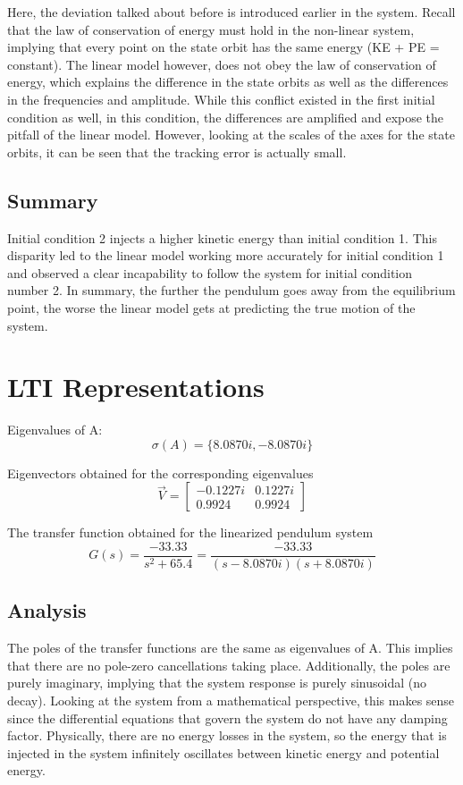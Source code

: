 \documentclass[10pt]{article}
\begin{document}
Here, the deviation talked about before is introduced earlier in the system. Recall that the law of conservation of energy must hold in the non-linear system, implying that every point on the state orbit has the same energy (KE + PE = constant). The linear model however, does not obey the law of conservation of energy, which explains the difference in the state orbits as well as the differences in the frequencies and amplitude. While this conflict existed in the first initial condition as well, in this condition, the differences are amplified and expose the pitfall of the linear model. However, looking at the scales of the axes for the state orbits, it can be seen that the tracking error is actually small. 

\subsection{Summary}
Initial condition 2 injects a higher kinetic energy than initial condition 1. This disparity led to the linear model working more accurately for initial condition 1 and observed a clear incapability to follow the system for initial condition number 2. In summary, the further the pendulum goes away from the equilibrium point, the worse the linear model gets at predicting the true motion of the system.

\section{LTI Representations}
Eigenvalues of A:
\begin{equation*}
    \sigma(A) = \{8.0870i, -8.0870i\}
\end{equation*}

Eigenvectors obtained for the corresponding eigenvalues
\begin{equation*}
    \vec{V} = \begin{bmatrix}
    -0.1227i & 0.1227i\\ 0.9924 & 0.9924 
    \end{bmatrix}
\end{equation*}

The transfer function obtained for the linearized pendulum system
\begin{equation*}
G(s) = \frac{-33.33}{s^2+65.4} = \frac{-33.33}{(s-8.0870i)(s+8.0870i)} 
\end{equation*}

\subsection{Analysis}
The poles of the transfer functions are the same as eigenvalues of A. This implies that there are no pole-zero cancellations taking place. Additionally, the poles are purely imaginary, implying that the system response is purely sinusoidal (no decay). Looking at the system from a mathematical perspective, this makes sense since the differential equations that govern the system do not have any damping factor. Physically, there are no energy losses in the system, so the energy that is injected in the system infinitely oscillates between kinetic energy and potential energy. 
\end{document}
